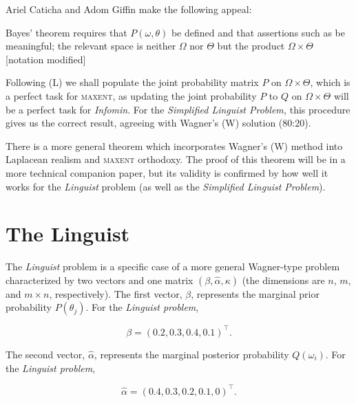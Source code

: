 Ariel Caticha and Adom Giffin make the following
appeal:

\begin{quotex}
  Bayes' theorem requires that $P(\omega,\theta)$ be defined and that
  assertions such as  be
  meaningful; the relevant space is neither $\Omega$ nor $\Theta$ but
  the product $\Omega\times\Theta$ [notation modified]
\end{quotex}

Following (L) we shall populate the joint probability matrix $P$ on
$\Omega\times\Theta$, which is a perfect task for \textsc{maxent}, as
updating the joint probability $P$ to $Q$ on $\Omega\times\Theta$ will
be a perfect task for \emph{Infomin}. For the \emph{Simplified
  Linguist Problem,} this procedure gives us the correct result,
agreeing with Wagner's (W) solution (80:20). 

There is a more general theorem which incorporates Wagner's (W) method
into Laplacean realism and \textsc{maxent} orthodoxy. The proof of
this theorem will be in a more technical companion paper, but its
validity is confirmed by how well it works for the \emph{Linguist}
problem (as well as the \emph{Simplified Linguist Problem}).

\section{The Linguist}
\label{TheLinguist}

The \emph{Linguist} problem is a specific case of a more general
Wagner-type problem characterized by two vectors and one matrix
$(\beta,\hat{\alpha},\kappa)$ (the dimensions are $n$, $m$, and
$m\times{}n$, respectively). The first vector, $\beta$, represents
the marginal prior probability $P(\theta_{j})$. For the \emph{Linguist
problem},

\begin{equation}
  \label{eq:p1}
  \beta=(0.2,0.3,0.4,0.1)^{\intercal}.
\end{equation}

The second vector, $\hat{\alpha}$, represents the marginal posterior
probability $Q(\omega_{i})$. For the \emph{Linguist problem},

\begin{equation}
  \label{eq:p2}
  \hat{\alpha}=(0.4,0.3,0.2,0.1,0)^{\intercal}.
\end{equation}


